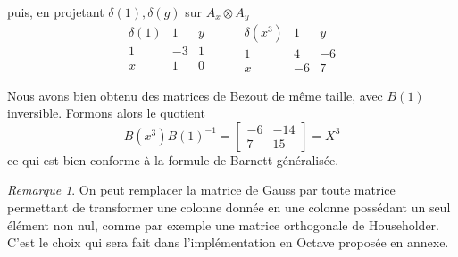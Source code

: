 \documentclass{article}
\theoremstyle{plain}%
\theoremstyle{definition}
\theoremstyle{remark}
\newtheorem*{rem}{Remarque}
\begin{document}
puis, en projetant $\delta(1), \delta(g)$ sur $A_x \otimes A_y$
$$
\begin{array}{c|cc}
	\delta(1) & 1 & y \\
	\hline
	1 & -3 & 1 \\
	x & 1 & 0
\end{array}
\hspace{1cm}
\begin{array}{c|cc}
	\delta(x^3) & 1 & y \\
	\hline
	1 & 4 & -6  \\
	x & -6 & 7
\end{array}
$$

Nous avons bien obtenu des matrices de Bezout de même taille, avec $B(1)$ inversible. Formons alors le quotient
\begin{equation}
	B(x^3)B(1)^{-1} =
	\begin{bmatrix}
		-6 & -14 \\
		7 & 15
	\end{bmatrix}
	= X^3
\end{equation}
ce qui est bien conforme à la formule de Barnett généralisée.

\begin{rem}
On peut remplacer la matrice de Gauss par toute matrice permettant de transformer une colonne donnée en une colonne possédant un seul élément non nul, comme par exemple une matrice orthogonale de Householder. C'est le choix qui sera fait dans l'implémentation en Octave proposée en annexe.

\end{rem}

\end{document}
